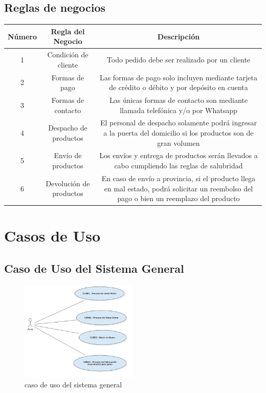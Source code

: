 \documentclass{article}
\begin{document}
\subsection{Reglas de negocios}
\begin{tabular}{| c | c | c |}
    \hline
    Número & Regla del Negocio & Descripción \\ \hline
    1 & Condición de cliente & Todo pedido debe ser realizado por un cliente \\
    2 & Formas de pago & Las formas de pago solo incluyen mediante tarjeta de crédito o débito y por depósito en cuenta \\
    3 & Formas de contacto & Las únicas formas de contacto son mediante llamada telefónica y/o por Whatsapp \\
    4 & Despacho de productos & El personal de despacho solamente podrá ingresar a la puerta del domicilio si los productos son de gran volumen \\
    5 & Envío de productos & Los envíos y entrega de productos serán llevados a cabo cumpliendo las reglas de salubridad \\
    6 & Devolución de productos & En caso de envío a provincia, si el producto llega en mal estado, podrá solicitar un reembolso del pago o bien un reemplazo del producto \\ \hline
    \end{tabular}
\clearpage
\section{Casos de Uso}
\subsection{Caso de Uso del Sistema General}
\begin{figure}[h]
    \begin{center}
        \includegraphics[width=0.5\textwidth]{images/Caso de uso general v2.png}
        \caption{caso de uso del sistema general}
    \end{center}
\end{figure}
\end{document}

